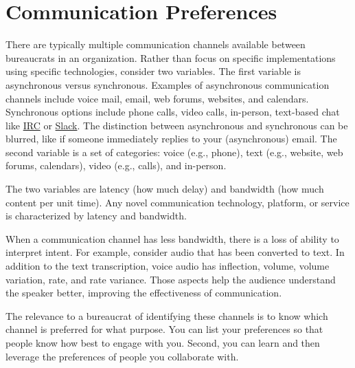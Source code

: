 \section{Communication Preferences\label{sec:communication-preferences}}

There are typically multiple communication channels available between bureaucrats in an organization. Rather than focus on specific implementations using specific technologies, consider two variables. The first variable is asynchronous versus synchronous. Examples of asynchronous communication channels include voice mail, email, web forums, websites, and calendars. Synchronous options include phone calls, video calls, in-person, text-based chat like \href{https://en.wikipedia.org/wiki/Internet_Relay_Chat}{IRC}
or \href{https://en.wikipedia.org/wiki/Slack_(software)}{Slack}.  
The distinction between asynchronous and synchronous can be blurred, like if someone immediately replies to your (asynchronous) email.  The second variable is a set of categories: voice (e.g., phone), text (e.g., website, web forums, calendars), video (e.g., calls), and in-person. 

The two variables are  latency (how much delay) and bandwidth (how much content per unit time). Any novel communication technology, platform, or service is characterized by latency and bandwidth. 

When a communication channel has less bandwidth, there is a loss of ability to interpret intent. 
For example, consider audio that has been converted to text. In addition to the text transcription, voice audio  has inflection, volume, volume variation, rate, and rate variance. Those aspects help the audience understand the speaker better, improving the effectiveness of communication.

The relevance to a bureaucrat of identifying these channels is to know which channel is preferred for what purpose.  You can list your preferences so that people know how best to engage with you.
Second, you can learn and then leverage the preferences of people you collaborate with.

